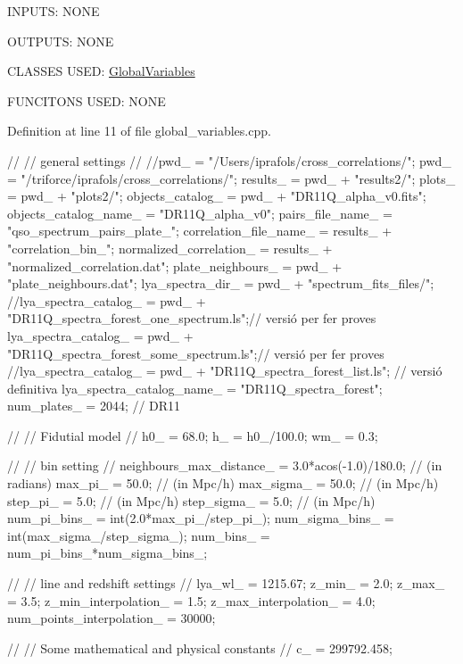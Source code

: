 I\-N\-P\-U\-T\-S\-: N\-O\-N\-E

O\-U\-T\-P\-U\-T\-S\-: N\-O\-N\-E

C\-L\-A\-S\-S\-E\-S U\-S\-E\-D\-: \hyperlink{class_global_variables}{Global\-Variables}

F\-U\-N\-C\-I\-T\-O\-N\-S U\-S\-E\-D\-: N\-O\-N\-E

Definition at line 11 of file global\-\_\-variables.\-cpp.


\begin{DoxyCode}
                                {
    //
    // general settings
    //
    //pwd_ = "/Users/iprafols/cross_correlations/";
    pwd_ = "/triforce/iprafols/cross_correlations/";
    results_ = pwd_ + "results2/";
    plots_ = pwd_ + "plots2/";
    objects_catalog_ = pwd_ + "DR11Q_alpha_v0.fits";
    objects_catalog_name_ = "DR11Q_alpha_v0";
    pairs_file_name_ = "qso_spectrum_pairs_plate_";
    correlation_file_name_ = results_ + "correlation_bin_";
    normalized_correlation_ = results_ + "normalized_correlation.dat";
    plate_neighbours_ = pwd_ + "plate_neighbours.dat";
    lya_spectra_dir_ = pwd_ + "spectrum_fits_files/";
    //lya_spectra_catalog_ = pwd_ + "DR11Q_spectra_forest_one_spectrum.ls";//
       versió per fer proves
    lya_spectra_catalog_ = pwd_ + "DR11Q_spectra_forest_some_spectrum.ls";//
       versió per fer proves
    //lya_spectra_catalog_ = pwd_ + "DR11Q_spectra_forest_list.ls"; // versió
       definitiva
    lya_spectra_catalog_name_ = "DR11Q_spectra_forest";
    num_plates_ = 2044; // DR11
    
    //
    // Fidutial model
    //
    h0_ = 68.0;
    h_ = h0_/100.0;
    wm_ = 0.3;
    
    //
    // bin setting
    //
    neighbours_max_distance_ = 3.0*acos(-1.0)/180.0; // (in radians)
    max_pi_ = 50.0; // (in Mpc/h)
    max_sigma_ = 50.0; // (in Mpc/h)
    step_pi_ = 5.0; // (in Mpc/h)
    step_sigma_ = 5.0; // (in Mpc/h)
    num_pi_bins_ = int(2.0*max_pi_/step_pi_);
    num_sigma_bins_ = int(max_sigma_/step_sigma_);
    num_bins_ = num_pi_bins_*num_sigma_bins_;
    
    //
    // line and redshift settings
    //
    lya_wl_ = 1215.67;
    z_min_ = 2.0;
    z_max_ = 3.5;
    z_min_interpolation_ = 1.5; 
    z_max_interpolation_ = 4.0; 
    num_points_interpolation_ = 30000; 
    
    //
    // Some mathematical and physical constants
    //
    c_ = 299792.458;
}\end{DoxyCode}


